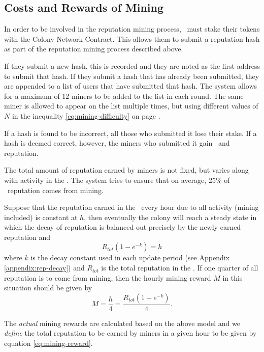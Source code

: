 \subsection{Costs and Rewards of Mining}\label{subsec:mining-costs-and-rewards}
In order to be involved in the reputation mining process, \rcths\ must stake their tokens with the Colony Network Contract. This allows them to submit a reputation hash as part of the reputation mining process described above.

If they submit a new hash, this is recorded and they are noted as the first address to submit that hash. If they submit a hash that has already been submitted, they are appended to a list of users that have submitted that hash. The system allows for a maximum of 12 miners to be added to the list in each round. The same miner is allowed to appear on the list multiple times, but using different values of $N$ in the inequality \eqref{eq:mining-difficulty} on page \pageref{eq:mining-difficulty}.

If a hash is found to be incorrect, all those who submitted it lose their stake. If a hash is deemed correct, however, the miners who submitted it gain \rcts\ and reputation. 

The total amount of reputation earned by miners is not fixed, but varies along with activity in the \rc. The system tries to ensure that on average, 25\% of \rc\ reputation comes from mining. %

Suppose that the reputation earned in the \rc\ every hour due to all activity (mining included) is constant at $h$, then eventually the colony will reach a steady state in which the decay of reputation is balanced out precisely by the newly earned reputation and
\begin{equation}
 R_{tot} \left( 1 - e^{-k} \right) = h
\end{equation}
\noindent where $k$ is the decay constant used in each update period (see Appendix \ref{appendix:rep-decay}) and $R_{tot}$ is the total reputation in the \rc. If one quarter of all reputation is to come from mining, then the hourly mining reward $M$ in this situation should be given by
\begin{equation}\label{eq:mining-reward}
 M = \frac{h}{4} = \frac{R_{tot} \left( 1 - e^{-k} \right)}{4}.
\end{equation}

The \emph{actual} mining rewards are calculated based on the above model and we \emph{define} the total reputation to be earned by miners in a given hour to be given by equation \eqref{eq:mining-reward}.

